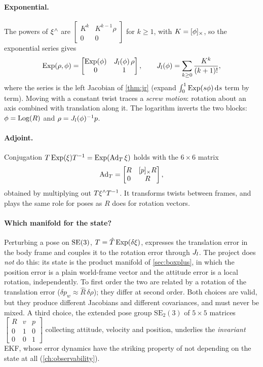 \paragraph{Exponential.} The powers of $\xi^{\wedge}$ are $\begin{bmatrix}K^k & K^{k-1}\rho\\0 & 0\end{bmatrix}$ for $k \ge 1$, with $K = [\phi]_{\times}$, so the exponential series gives
\begin{equation}
  \operatorname{Exp}(\rho, \phi) = \begin{bmatrix}\operatorname{Exp}(\phi) & J_l(\phi)\,\rho \\ 0 & 1\end{bmatrix},
  \qquad J_l(\phi) = \sum_{k\ge0}\frac{K^k}{(k + 1)!},
\end{equation}
where the series is the left Jacobian of \cref{thm:jr} (expand $\int_0^1\operatorname{Exp}(s\phi)\,\mathrm{d} s$ term by term). Moving with a constant twist traces a
\emph{screw motion}: rotation about an axis combined with translation along it. The logarithm inverts the two blocks: $\phi = \operatorname{Log}(R)$ and
$\rho = J_l(\phi)^{-1} p$.

\paragraph{Adjoint.} Conjugation $T\operatorname{Exp}(\xi)T^{-1} = \operatorname{Exp}(\operatorname{Ad}_T\xi)$ holds with the $6\times6$ matrix
\begin{equation}
  \operatorname{Ad}_T = \begin{bmatrix} R & [p]_{\times}R \\ 0 & R \end{bmatrix},
\end{equation}
obtained by multiplying out $T\xi^{\wedge} T^{-1}$. It transforms twists between frames, and plays the same role for poses as $R$ does for rotation vectors.

\paragraph{Which manifold for the state?} Perturbing a pose on $\mathrm{SE}(3)$, $T = \hat T\operatorname{Exp}(\delta\xi)$, expresses the translation error in the body frame
and couples it to the rotation error through $J_l$. The project does \emph{not} do this: its state is the product manifold of
\cref{sec:boxplus}, in which the position error is a plain world-frame vector and the attitude error is a local rotation, independently.
To first order the two are related by a rotation of the translation error ($\delta p_w \approx \hat R\,\delta\rho$); they differ at second order. Both
choices are valid, but they produce different Jacobians and different covariances, and must never be mixed. A third choice, the
extended pose group $\mathrm{SE}_2(3)$ of $5\times5$ matrices $\begin{bmatrix}R & v & p\\0 & 1 & 0\\0 & 0 & 1\end{bmatrix}$ collecting attitude, velocity and
position, underlies the \emph{invariant} EKF, whose error dynamics have the striking property of not depending on the state at all
(\cref{ch:observability}).

